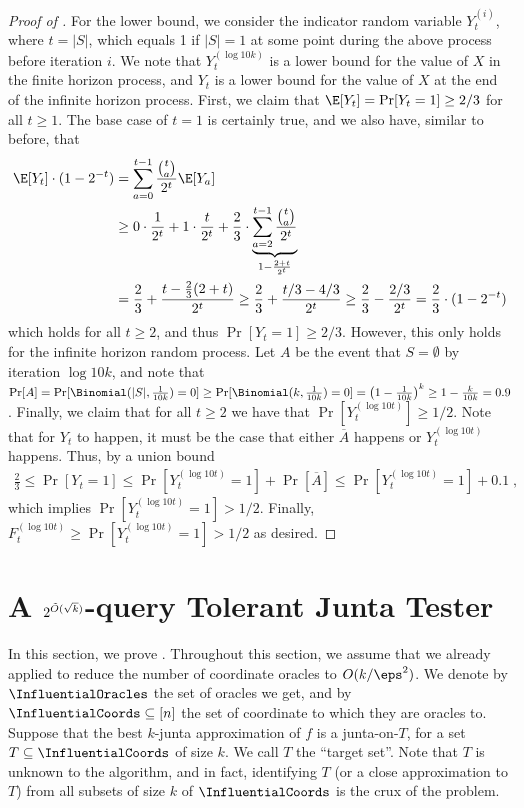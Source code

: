 \begin{proof}[Proof of ]
For the lower bound, we consider the indicator random variable $Y_t^{(i)}$, where $t = |S|$, which equals 1 if $|S|=1$ at some point during the above process before iteration $i$. We note that $Y_t^{(\log 10k)}$ is a lower bound for the value of $X$ in the finite horizon process, and $Y_t$ is a lower bound for the value of $X$ at the end of the infinite horizon process. First, we claim that $\E[Y_t] = \Pr[Y_t = 1] \geq 2/3$ for all $t \geq 1$. The base case of $t=1$ is certainly true, and we also have, similar to before, that
\begin{align*}
    \E[Y_t]\cdot (1-2^{-t}) &= \sum_{a=0}^{t-1} \frac{\binom{t}{a}}{2^t}\E[Y_a] \\
    &\ge 0\cdot \frac{1}{2^t} + 1\cdot\frac{t}{2^t} +\frac{2}{3}\cdot \underbrace{\sum_{a=2}^{t-1} \frac{\binom{t}{a}}{2^t}}_{1 - \frac{2+t}{2^t}} \\
    &= \frac{2}{3} + \frac{t - \frac{2}{3}(2+t)}{2^t} \geq \frac{2}{3} + \frac{t/3 - 4/3}{2^t} \ge \frac{2}{3} - \frac{2/3}{2^t} = \frac{2}{3} \cdot (1-2^{-t})
    \end{align*}
which holds for all $t \geq 2$, and thus $\Pr[Y_t = 1] \geq 2/3$. However, this only holds for the infinite horizon random process. Let $A$ be the event that $S = \emptyset$ by iteration $\log 10k$, and note that $\Pr[A] = \Pr[\Binomial(|S|, \frac{1}{10k}) = 0] \geq \Pr[\Binomial(k, \frac{1}{10k}) = 0]  = \left( 1-\frac{1}{10k}\right )^{k}  \geq 1-\frac{k}{10k} = 0.9$. Finally, we claim that for all $t\geq 2$ we have that $\Pr[Y_t^{(\log 10t)}]\geq 1/2$. Note that for $Y_t$ to happen, it must be the case that either $\overline{A}$ happens or $Y_t^{(\log 10t)}$ happens. Thus, by a union bound
\begin{align*}
\tfrac{2}{3} \le \Pr[Y_t = 1] \le 
    \Pr[Y_t^{(\log 10t)}=1]  + \Pr[\overline{A}] \le     \Pr[Y_t^{(\log 10t)}=1] + 0.1\;,
\end{align*}
which  implies  $\Pr[Y_t^{(\log 10t)}=1] >1/2$. Finally, $F_t^{(\log 10t)} \geq \Pr[Y_t^{(\log 10t)}=1] > 1/2$ as desired.
\end{proof}

\section{A $2^{\Tilde{O}(\sqrt{k})}$-query Tolerant Junta Tester}
\label{section:main-result}

In this section, we prove . Throughout this section, we  assume that we already applied  to reduce the number of coordinate oracles to $O(k/\eps^2)$. We denote by $\InfluentialOracles$ the set of oracles we get, and by $\InfluentialCoords \subseteq [n]$ the set of coordinate to which they are oracles to.
Suppose that the best $k$-junta approximation of $f$ is a junta-on-$T$, for a 
set $T \subseteq \InfluentialCoords$  of size $k$. We call $T$ the ``target set''. Note that $T$ is unknown to the algorithm, and in fact, identifying $T$ (or a close approximation to $T$) from all subsets of  size $k$ of $\InfluentialCoords$ is the crux of the problem.


